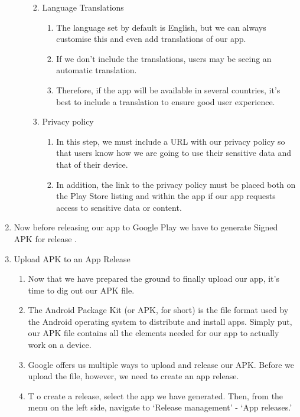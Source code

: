 \begin{enumerate}
\begin{enumerate}
\begin{enumerate}
\begin{enumerate}
            \end{enumerate}
            \item Language Translations
            \begin{enumerate}
                \item The language set by default is English, but we can always customise this and even add translations of our app. 
                \item If we don’t include the translations, users may be seeing an automatic translation.
                \item Therefore, if the app will be available in several countries, it’s best to include a translation to ensure good user experience.
            \end{enumerate}
            \item Privacy policy
            \begin{enumerate}
                \item In this step, we must include a URL with our privacy policy so that users know how we are going to use their sensitive data and that of their device. 
                \item In addition, the link to the privacy policy must be placed both on the Play Store listing and within the app if our app requests access to sensitive data or content.
            \end{enumerate}
        \end{enumerate}
    \end{enumerate}
    \item Now before releasing our app to Google Play we have to generate Signed APK for release .
    \item Upload APK to an App Release
    \begin{enumerate}
        \item Now that we have prepared the ground to finally upload our app, it’s time to dig out our APK file.
        \item The Android Package Kit (or APK, for short) is the file format used by the Android operating system to distribute and install apps. Simply put, our APK file contains all the elements needed for our app to actually work on a device.
        \item Google offers us multiple ways to upload and release our APK. Before we upload the file, however, we need to create an app release.
        \item T o create a release, select the app we have generated. Then, from the menu on the left side, navigate to ‘Release management’ - ‘App releases.’

\end{enumerate}
\end{enumerate}
